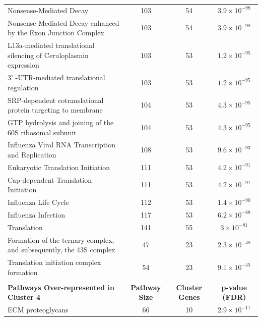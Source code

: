 \begin{table}[!Hp]
{\begin{tabular}{lccc}
  \rowcolor{Cluster_Orange!30} 
  Nonsense-Mediated Decay & 103 &  54 & $3.9 \times 10^{-98}$ \\ 
  \rowcolor{Cluster_Orange!20} 
  Nonsense Mediated Decay enhanced by the Exon Junction Complex & 103 &  54 & $3.9 \times 10^{-98}$ \\ 
  \rowcolor{Cluster_Orange!30} 
  L13a-mediated translational silencing of Ceruloplasmin expression & 103 &  53 & $1.2 \times 10^{-95}$ \\ 
  \rowcolor{Cluster_Orange!20} 
  3' -UTR-mediated translational regulation & 103 &  53 & $1.2 \times 10^{-95}$ \\ 
  \rowcolor{Cluster_Orange!30} 
  SRP-dependent cotranslational protein targeting to membrane & 104 &  53 & $4.3 \times 10^{-95}$ \\ 
  \rowcolor{Cluster_Orange!20} 
  GTP hydrolysis and joining of the 60S ribosomal subunit & 104 &  53 & $4.3 \times 10^{-95}$ \\ 
  \rowcolor{Cluster_Orange!30} 
  Influenza Viral RNA Transcription and Replication & 108 &  53 & $9.6 \times 10^{-93}$ \\ 
  \rowcolor{Cluster_Orange!20} 
  Eukaryotic Translation Initiation & 111 &  53 & $4.2 \times 10^{-91}$ \\ 
  \rowcolor{Cluster_Orange!30} 
  Cap-dependent Translation Initiation & 111 &  53 & $4.2 \times 10^{-91}$ \\ 
  \rowcolor{Cluster_Orange!20} 
  Influenza Life Cycle & 112 &  53 & $1.4 \times 10^{-90}$ \\ 
  \rowcolor{Cluster_Orange!30} 
  Influenza Infection & 117 &  53 & $6.2 \times 10^{-88}$ \\ 
  \rowcolor{Cluster_Orange!20} 
  Translation & 141 &  55 & $3 \times 10^{-81}$ \\ 
  \rowcolor{Cluster_Orange!30} 
  Formation of the ternary complex, and subsequently, the 43S complex &  47 &  23 & $2.3 \times 10^{-48}$ \\ 
  \rowcolor{Cluster_Orange!20} 
  Translation initiation complex formation &  54 &  23 & $9.1 \times 10^{-45}$ \\ 
  \hline
  \\ 
  \cellcolor{white} \large{\textbf{Pathways Over-represented in Cluster 4}} & \large{\textbf{Pathway Size}} & \large{\textbf{Cluster Genes}} & \large{\textbf{p-value (FDR)}} \\ %
  \hline 
  \rowcolor{Cluster_Red!20}
  ECM proteoglycans &  66 &  10 & $2.9 \times 10^{-11}$ \\ 

\end{tabular}}
\end{table}
